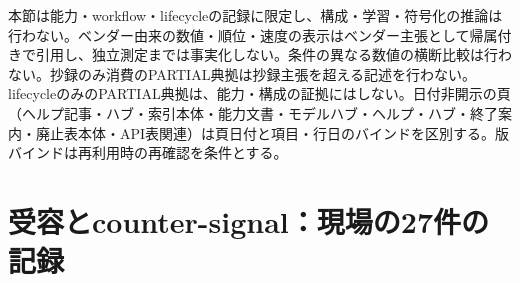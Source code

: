 \documentclass[lualatex,a4paper,10pt]{jlreq}
\begin{document}
\begin{claimboundary}[本節の読解上の境界]
本節は能力・workflow・lifecycleの記録に限定し、構成・学習・符号化の推論は行わない。ベンダー由来の数値・順位・速度の表示はベンダー主張として帰属付きで引用し、独立測定までは事実化しない。条件の異なる数値の横断比較は行わない。抄録のみ消費のPARTIAL典拠は抄録主張を超える記述を行わない。lifecycleのみのPARTIAL典拠は、能力・構成の証拠にはしない。日付非開示の頁（ヘルプ記事・ハブ・索引本体・能力文書・モデルハブ・ヘルプ・ハブ・終了案内・廃止表本体・API表関連）は頁日付と項目・行日のバインドを区別する。版バインドは再利用時の再確認を条件とする。
\end{claimboundary}

\section{受容とcounter-signal：現場の27件の記録}
\label{sec:reception}
\end{document}
